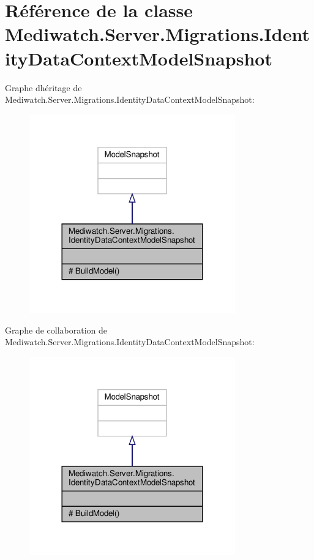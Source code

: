 \hypertarget{class_mediwatch_1_1_server_1_1_migrations_1_1_identity_data_context_model_snapshot}{}\section{Référence de la classe Mediwatch.\+Server.\+Migrations.\+Identity\+Data\+Context\+Model\+Snapshot}
\label{class_mediwatch_1_1_server_1_1_migrations_1_1_identity_data_context_model_snapshot}


Graphe d\textquotesingle{}héritage de Mediwatch.\+Server.\+Migrations.\+Identity\+Data\+Context\+Model\+Snapshot\+:\nopagebreak
\begin{figure}[H]
\begin{center}
\leavevmode
\includegraphics[width=252pt]{class_mediwatch_1_1_server_1_1_migrations_1_1_identity_data_context_model_snapshot__inherit__graph}
\end{center}
\end{figure}


Graphe de collaboration de Mediwatch.\+Server.\+Migrations.\+Identity\+Data\+Context\+Model\+Snapshot\+:\nopagebreak
\begin{figure}[H]
\begin{center}
\leavevmode
\includegraphics[width=252pt]{class_mediwatch_1_1_server_1_1_migrations_1_1_identity_data_context_model_snapshot__coll__graph}
\end{center}
\end{figure}
